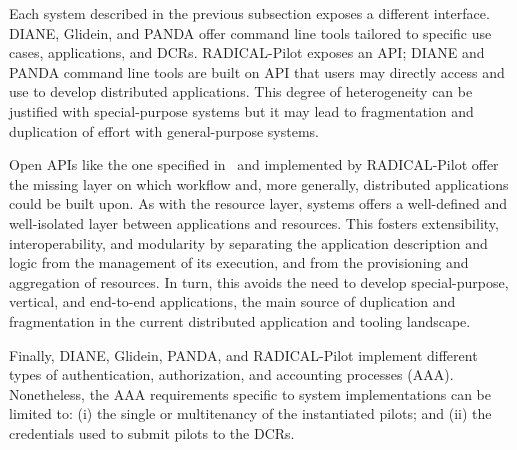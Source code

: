 \documentclass{sig-alternate}
\begin{document}








Each \pilot system described in the previous subsection exposes a different
interface.  DIANE, Glidein, and PANDA offer command
line tools tailored
to specific use cases, applications, and DCRs. RADICAL-Pilot exposes an API;
DIANE and PANDA command line tools are built on API that users may directly
access and use to develop distributed applications. This degree of heterogeneity
can be justified with special-purpose \pilot systems but it may lead to
fragmentation and duplication of effort with general-purpose
systems. 

Open APIs like the one specified in~\cite{luckow2012towards} and implemented by
RADICAL-Pilot offer the missing layer on which workflow and, more generally,
distributed applications could be built upon. As with the resource layer, \pilot
systems offers a well-defined and well-isolated layer between applications and
resources. This fosters extensibility, interoperability, and modularity by
separating the application description and logic from the management of its
execution, and from the provisioning and aggregation of resources. In turn, this
avoids the need to develop special-purpose, vertical, and end-to-end
applications, the main source of duplication and fragmentation in the current
distributed application and tooling landscape.




Finally, DIANE, Glidein, PANDA, and RADICAL-Pilot implement
different types of authentication, authorization, and accounting processes
(AAA). Nonetheless, the AAA requirements specific to \pilot system
implementations can be limited to: (i) the single or multitenancy of the
instantiated pilots; and (ii) the credentials used to submit pilots to the DCRs.
\end{document}
